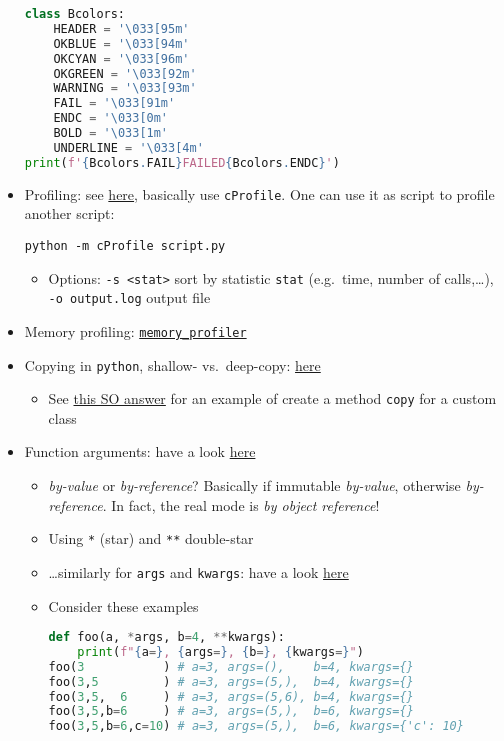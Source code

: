 \documentclass[a4paper,12pt,%
              final%
              ]{article}
\begin{document}
\begin{itemize}
\begin{lstlisting}[language=python]
class Bcolors:
    HEADER = '\033[95m'
    OKBLUE = '\033[94m'
    OKCYAN = '\033[96m'
    OKGREEN = '\033[92m'
    WARNING = '\033[93m'
    FAIL = '\033[91m'
    ENDC = '\033[0m'
    BOLD = '\033[1m'
    UNDERLINE = '\033[4m'
print(f'{Bcolors.FAIL}FAILED{Bcolors.ENDC}')
\end{lstlisting}
  \item Profiling: see \href{https://docs.python.org/3/library/profile.html}{here}, basically use \texttt{cProfile}. One can use it as script to profile another script:
\begin{verbatim}
python -m cProfile script.py
\end{verbatim}
    \begin{itemize}
      \item Options: \verb|-s <stat>| sort by statistic \texttt{stat} (e.g.\ time, number of calls,\ldots), \verb|-o output.log| output file
    \end{itemize}
  \item Memory profiling: \href{https://github.com/pythonprofilers/memory_profiler}{\texttt{memory\_profiler}}
  \item Copying in \texttt{python}, shallow- vs.\ deep-copy: \href{https://www.programiz.com/python-programming/shallow-deep-copy}{here}
    \begin{itemize}
      \item See \href{https://stackoverflow.com/a/46939443}{this SO answer} for an example of create a method \texttt{copy} for a custom class
    \end{itemize}
  \item Function arguments: have a look \href{https://www.python-course.eu/python3_passing_arguments.php}{here}
    \begin{itemize}
      \item \emph{by-value} or \emph{by-reference}? Basically if immutable \emph{by-value}, otherwise \emph{by-reference}. In fact, the real mode is \emph{by object reference}!
      \item Using \texttt{*} (star) and \texttt{**} double-star
      \item \ldots{}similarly for \texttt{args} and \texttt{kwargs}: have a look \href{https://realpython.com/python-kwargs-and-args/}{here}
      \item Consider these examples
\begin{lstlisting}[language=python]
def foo(a, *args, b=4, **kwargs):
    print(f"{a=}, {args=}, {b=}, {kwargs=}")
foo(3           ) # a=3, args=(),    b=4, kwargs={}
foo(3,5         ) # a=3, args=(5,),  b=4, kwargs={}
foo(3,5,  6     ) # a=3, args=(5,6), b=4, kwargs={}
foo(3,5,b=6     ) # a=3, args=(5,),  b=6, kwargs={}
foo(3,5,b=6,c=10) # a=3, args=(5,),  b=6, kwargs={'c': 10}


\end{lstlisting}
\end{itemize}
\end{itemize}
\end{document}
